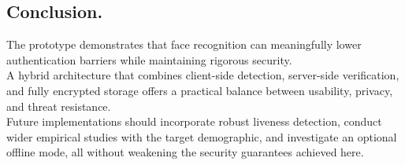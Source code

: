 \subsection{Conclusion.}
The prototype demonstrates that face recognition can meaningfully lower authentication barriers while maintaining rigorous security. \\ 
A hybrid architecture that combines client-side detection, server-side verification, and fully encrypted storage offers a practical balance between usability, privacy, and threat resistance. \\ 
Future implementations should incorporate robust liveness detection, conduct wider empirical studies with the target demographic, and investigate an optional offline mode, all without weakening the security guarantees achieved here.\\
